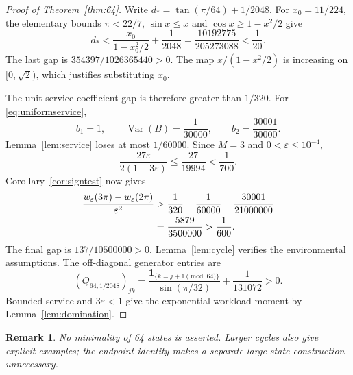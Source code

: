 \documentclass[10pt,a4paper]{amsart}
\numberwithin{equation}{section}
\newtheorem{remark}[theorem]{Remark}
\newcommand{\1}{\mathbf 1}
\newcommand{\eps}{\varepsilon}
\DeclareMathOperator{\Var}{Var}
\begin{document}
\begin{proof}[Proof of Theorem~\ref{thm:64}]
Write $d_* = \tan(\pi/64)+1/2048$. For $x_0=11/224$, the elementary bounds $\pi<22/7$, $\sin x\le x$ and $\cos x\ge1-x^2/2$ give
\begin{equation}\label{eq:64damping}
 d_*<\frac{x_0}{1-x_0^2/2}+\frac1{2048}
 =\frac{10192775}{205273088}<\frac1{20}.
\end{equation}
The last gap is $354397/1026365440>0$. The map $x/(1-x^2/2)$ is increasing on $[0,\sqrt2)$, which justifies substituting $x_0$.

The unit-service coefficient gap is therefore greater than $1/320$. For \eqref{eq:uniformservice},
\begin{equation}\label{eq:uniformmoments}
 b_1=1,\qquad \Var(B)=\frac1{30000},\qquad b_2=\frac{30001}{30000}.
\end{equation}
Lemma~\ref{lem:service} loses at most $1/60000$. Since $M=3$ and $0<\eps\le10^{-4}$,
\[
 \frac{27\eps}{2(1-3\eps)}\le\frac{27}{19994}<\frac1{700}.
\]
Corollary~\ref{cor:signtest} now gives
\begin{align}\label{eq:64fullmargin}
 \frac{w_\eps(3\pi)-w_\eps(2\pi)}{\eps^2}
 &>\frac1{320}-\frac1{60000}-\frac{30001}{21000000}\notag\\
 &=\frac{5879}{3500000}>\frac1{600}.
\end{align}
The final gap is $137/10500000>0$. Lemma~\ref{lem:cycle} verifies the environmental assumptions. The off-diagonal generator entries are
\[
 (Q_{64,1/2048})_{jk}
 =\frac{\1_{\{k=j+1\pmod{64}\}}}{\sin(\pi/32)}+\frac1{131072}>0.
\]
Bounded service and $3\eps<1$ give the exponential workload moment by Lemma~\ref{lem:domination}.
\end{proof}
\begin{remark}
No minimality of 64 states is asserted. Larger cycles also give explicit examples; the endpoint identity makes a separate large-state construction unnecessary.
\end{remark}
\end{document}
